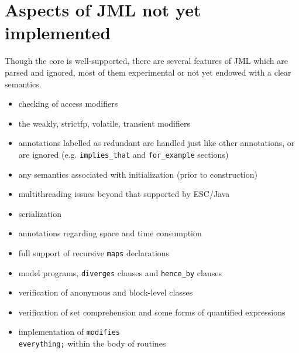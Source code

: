 \documentclass{acm_proc_article-sp}
\begin{document}
\section{Aspects of JML not yet implemented}
Though the core is well-supported, there are several features of JML which are parsed and
ignored, most of them experimental or not yet endowed with a clear semantics.  
\setlength{\partopsep}{0in}\setlength{\parskip}{0in}
\begin{itemize}\setlength{\itemsep}{0in}
\item checking of access modifiers
\item the weakly, strictfp, volatile, transient modifiers
\item annotations labelled as redundant are handled just like other annotations, 
or are ignored (e.g. {\tt implies\_that} and {\tt for\_example} sections)
\item any semantics associated with initialization (prior to construction)
\item multithreading issues beyond that supported by ESC/Java
\item serialization
\item annotations regarding space and time consumption
\item full support of recursive {\tt maps} declarations
\item model programs, {\tt diverges} clauses and {\tt hence\_by} clauses
\item verification of anonymous and block-level classes
\item verification of set comprehension and some forms of quantified expressions
\item implementation of {\tt modifies \\everything;} within the body of routines
\end{itemize}
\end{document}
